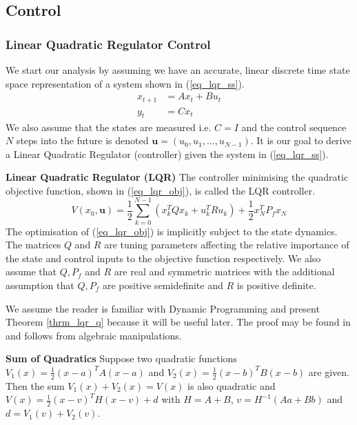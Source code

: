 \documentclass[../masters.tex]{subfiles}
\begin{document}
\subsection{Control}

\subsubsection{Linear Quadratic Regulator Control}
We start our analysis by assuming we have an accurate, linear discrete time state space representation of a system shown in (\ref{eq_lqr_ss}).
\begin{equation}
\begin{aligned}
x_{t+1} &= Ax_t+ Bu_t \\
y_t &= Cx_t
\end{aligned}
\label{eq_lqr_ss}
\end{equation}
We also assume that the states are measured i.e. $C=I$ and the control sequence $N$ steps into the future is denoted $\mathbf{u}=(u_0, u_1,...,u_{N-1})$. It is our goal to derive a Linear Quadratic Regulator (controller) given the system in (\ref{eq_lqr_ss}).
\begin{defn}
\textbf{Linear Quadratic Regulator (LQR)} The controller minimising the quadratic objective function, shown in (\ref{eq_lqr_obj}), is called the LQR controller. 
\begin{equation}
V(x_0, \mathbf{u}) = \frac{1}{2}\sum_{k=0}^{N-1} \left( x_k^TQx_k + u_k^TRu_k \right) + \frac{1}{2}x_N^TP_fx_N
\label{eq_lqr_obj}
\end{equation}
The optimisation of (\ref{eq_lqr_obj}) is implicitly subject to the state dynamics. The matrices $Q$ and $R$ are tuning parameters affecting the relative importance of the state and control inputs to the objective function respectively. We also assume that $Q, P_f$ and $R$ are real and symmetric matrices with the additional assumption that $Q, P_f$ are positive semidefinite and $R$ is positive definite.
\label{def_lqr}
\end{defn}
We assume the reader is familiar with Dynamic Programming and present Theorem \ref{thrm_lqr_q} because it will be useful later. The proof may be found in \cite{raw} and follows from algebraic manipulations.
\begin{thrm}
\textbf{Sum of Quadratics} Suppose two quadratic functions $V_1(x) = \frac{1}{2}(x-a)^TA(x-a)$ and $V_2(x) = \frac{1}{2}(x-b)^TB(x-b)$ are given. Then the sum $V_1(x) + V_2(x) = V(x)$ is also quadratic and $V(x) = \frac{1}{2}(x-v)^TH(x-v)+d$ with $H = A+B$, $v = H^{-1}(Aa+Bb)$ and $d = V_1(v) + V_2(v)$.
\label{thrm_lqr_q}
\end{thrm}
\end{document}
